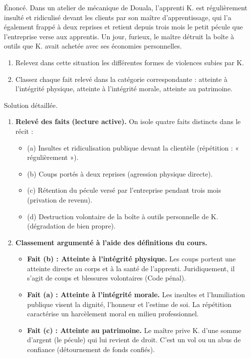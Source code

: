 \documentclass[11pt]{article}
\newcommand{\cle}[1]{{\popxbold\color{popdark}#1}}
\begin{document}
\begin{exoresolu}
Énoncé. Dans un atelier de mécanique de Douala, l'apprenti K. est régulièrement insulté et ridiculisé devant les clients par son maître d'apprentissage, qui l'a également frappé à deux reprises et retient depuis trois mois le petit pécule que l'entreprise verse aux apprentis. Un jour, furieux, le maître détruit la boîte à outils que K. avait achetée avec ses économies personnelles.
\begin{enumerate}
\item Relevez dans cette situation les différentes formes de violences subies par K.
\item Classez chaque fait relevé dans la catégorie correspondante : atteinte à l'intégrité physique, atteinte à l'intégrité morale, atteinte au patrimoine.
\end{enumerate}
\tcblower
Solution détaillée.
\begin{enumerate}
\item \textbf{Relevé des faits (lecture active).} On isole quatre faits distincts dans le récit :
\begin{itemize}
\item (a) Insultes et ridiculisation publique devant la clientèle (répétition : « régulièrement »).
\item (b) Coups portés à deux reprises (agression physique directe).
\item (c) Rétention du pécule versé par l'entreprise pendant trois mois (privation de revenu).
\item (d) Destruction volontaire de la boîte à outils personnelle de K. (dégradation de bien propre).
\end{itemize}
\item \textbf{Classement argumenté à l'aide des définitions du cours.}
\begin{itemize}
\item \textbf{Fait (b) : Atteinte à l'intégrité physique.} Les coups portent une atteinte directe au corps et à la santé de l'apprenti. Juridiquement, il s'agit de \cle{coups et blessures volontaires} (Code pénal).
\item \textbf{Fait (a) : Atteinte à l'intégrité morale.} Les insultes et l'humiliation publique visent la dignité, l'honneur et l'estime de soi. La répétition caractérise un \cle{harcèlement moral} en milieu professionnel.
\item \textbf{Fait (c) : Atteinte au patrimoine.} Le maître prive K. d'une somme d'argent (le pécule) qui lui revient de droit. C'est un \cle{vol} ou un \cle{abus de confiance} (détournement de fonds confiés).

\end{itemize}
\end{enumerate}
\end{exoresolu}
\end{document}
